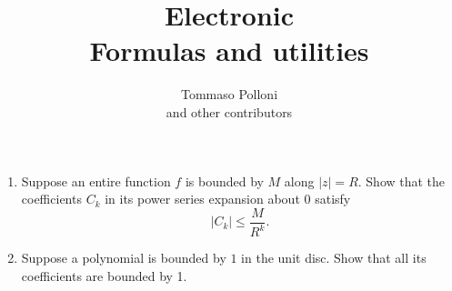 \documentclass[12pt]{article}
\newenvironment{problem}[2][Problem]{\begin{trivlist}
\item[\hskip \labelsep {\bfseries #1}\hskip \labelsep {\bfseries #2.}]}{\end{trivlist}}
\begin{document}
 
 
\title{Electronic\\
Formulas and utilities}
\author{Tommaso Polloni\\
and other contributors} 
 
\maketitle









\newpage
\begin{problem}{6}
\begin{enumerate}[label=\alph*)]
    \item Suppose an entire function $f$ is bounded by $M$ along $|z|=R$. Show that the coefficients $C_k$ in its power series expansion about $0$ satisfy
    \[
    |C_k|\leq\frac{M}{R^k}.
    \]
    \item Suppose a polynomial is bounded by $1$ in the unit disc. Show that all its coefficients are bounded by 1.
\end{enumerate}
\end{problem}
\end{document}
